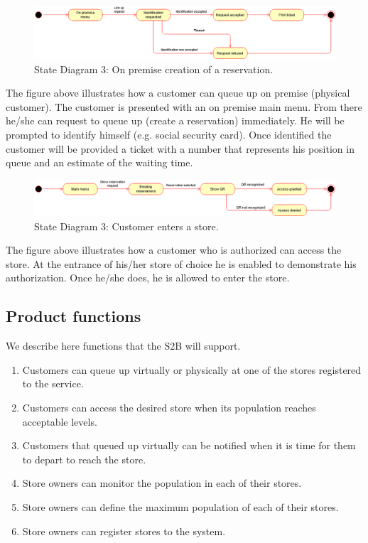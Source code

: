 \begin{figure}[!htb]
	\centering
	\includegraphics[width=\textwidth]{Images/StateDiagram3.png}
	\caption{State Diagram 3: On premise creation of a reservation.}
\end{figure}
The figure above illustrates how a customer can queue up on premise (physical customer). The customer is presented with an on premise main menu. From there he/she can request to queue up (create a reservation) immediately. He will be prompted to identify himself (e.g. social security card). Once identified the customer will be provided a ticket with a number that represents his position in queue and an estimate of the waiting time.

\begin{figure}[!htb]
	\centering
	\includegraphics[width=\textwidth]{Images/StateDiagram4.png}
	\caption{State Diagram 3: Customer enters a store.}
\end{figure}
The figure above illustrates how a customer who is authorized can access the store. At the entrance of his/her store of choice he is enabled to demonstrate his authorization. Once he/she does, he is allowed to enter the store.

\subsection{Product functions}
We describe here functions that the S2B will support.
\begin{enumerate}
	\item Customers can queue up virtually or physically at one of the stores registered to the service.
	\item Customers can access the desired store when its population reaches acceptable levels.
	\item Customers that queued up virtually can be notified when it is time for them to depart to reach the store.
	\item Store owners can monitor the population in each of their stores.
	\item Store owners can define the maximum population of each of their stores.
	\item Store owners can register stores to the system.
\end{enumerate}

